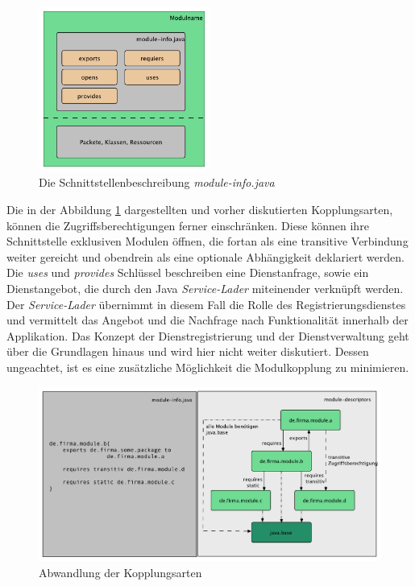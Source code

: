     \begin{figure}[h!]
      \centering
      \includegraphics[width=0.5\textwidth]{material/images/module-info.pdf}
      \caption{Die Schnittstellenbeschreibung \textit{module-info.java}}
      \label{fig:module-info}
    \end{figure}

    Die in der Abbildung \ref{fig:module-info} dargestellten und vorher diskutierten Kopplungsarten, können die Zugriffsberechtigungen ferner einschränken. Diese können ihre Schnittstelle exklusiven Modulen öffnen, die fortan als eine transitive Verbindung weiter gereicht und obendrein als eine optionale Abhängigkeit deklariert werden. Die \textit{uses} und \textit{provides} Schlüssel beschreiben eine Dienstanfrage, sowie ein Dienstangebot, die durch den Java \textit{Service-Lader} miteinender verknüpft werden.\newline
    Der \textit{Service-Lader} übernimmt in diesem Fall die Rolle des Registrierungsdienstes und vermittelt das Angebot und die Nachfrage nach Funktionalität innerhalb der Applikation. Das Konzept der Dienstregistrierung und der Dienstverwaltung geht über die Grundlagen hinaus und wird hier nicht weiter diskutiert. Dessen ungeachtet, ist es eine zusätzliche Möglichkeit die Modulkopplung zu minimieren. \cite{softModDes,modulMitJava9} \bigbreak

      \begin{figure}[h!]
      \centering
      \includegraphics[width=\textwidth]{material/images/transitiv.pdf}
      \caption{Abwandlung der Kopplungsarten}
      \label{fig:abw-kopl}
  \end{figure}

